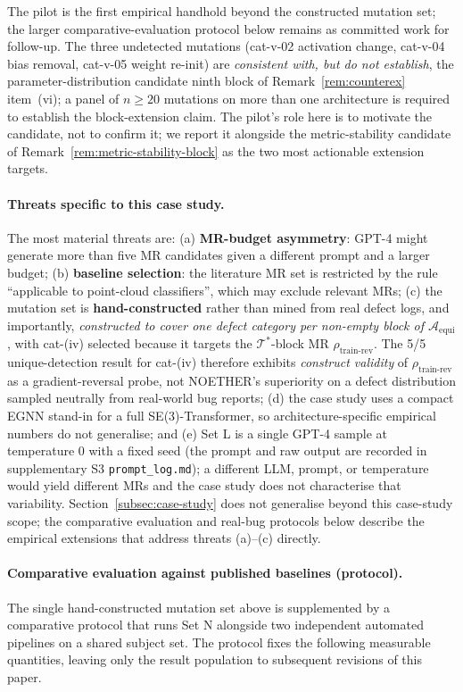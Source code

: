 \documentclass[acmsmall, screen]{acmart}
\begin{document}
The pilot is the first empirical handhold beyond the constructed mutation set; the larger comparative-evaluation protocol below remains as committed work for follow-up. The three undetected mutations (cat-v-02 activation change, cat-v-04 bias removal, cat-v-05 weight re-init) are \emph{consistent with, but do not establish}, the parameter-distribution candidate ninth block of Remark~\ref{rem:counterex} item~(vi); a panel of $n \ge 20$ mutations on more than one architecture is required to establish the block-extension claim. The pilot's role here is to motivate the candidate, not to confirm it; we report it alongside the metric-stability candidate of Remark~\ref{rem:metric-stability-block} as the two most actionable extension targets.

\paragraph{Threats specific to this case study.}
The most material threats are: (a) \textbf{MR-budget asymmetry}: GPT-4 might generate more than five MR candidates given a different prompt and a larger budget; (b) \textbf{baseline selection}: the literature MR set is restricted by the rule ``applicable to point-cloud classifiers'', which may exclude relevant MRs; (c) the mutation set is \textbf{hand-constructed} rather than mined from real defect logs, and importantly, \emph{constructed to cover one defect category per non-empty block of $\mathcal{A}_{\mathrm{equi}}$}, with cat-(iv) selected because it targets the $\mathcal{T}^*$-block MR $\rho_{\mathrm{train\text{-}rev}}$. The 5/5 unique-detection result for cat-(iv) therefore exhibits \emph{construct validity} of $\rho_{\mathrm{train\text{-}rev}}$ as a gradient-reversal probe, not NOETHER's superiority on a defect distribution sampled neutrally from real-world bug reports; (d) the case study uses a compact EGNN stand-in for a full SE(3)-Transformer, so architecture-specific empirical numbers do not generalise; and (e) Set L is a single GPT-4 sample at temperature 0 with a fixed seed (the prompt and raw output are recorded in supplementary S3 \texttt{prompt\_log.md}); a different LLM, prompt, or temperature would yield different MRs and the case study does not characterise that variability. Section~\ref{subsec:case-study} does not generalise beyond this case-study scope; the comparative evaluation and real-bug protocols below describe the empirical extensions that address threats (a)--(c) directly.

\paragraph{Comparative evaluation against published baselines (protocol).}
\label{para:comp-eval-protocol}
The single hand-constructed mutation set above is supplemented by a comparative protocol that runs Set N alongside two independent automated pipelines on a shared subject set. The protocol fixes the following measurable quantities, leaving only the result population to subsequent revisions of this paper.
\end{document}
